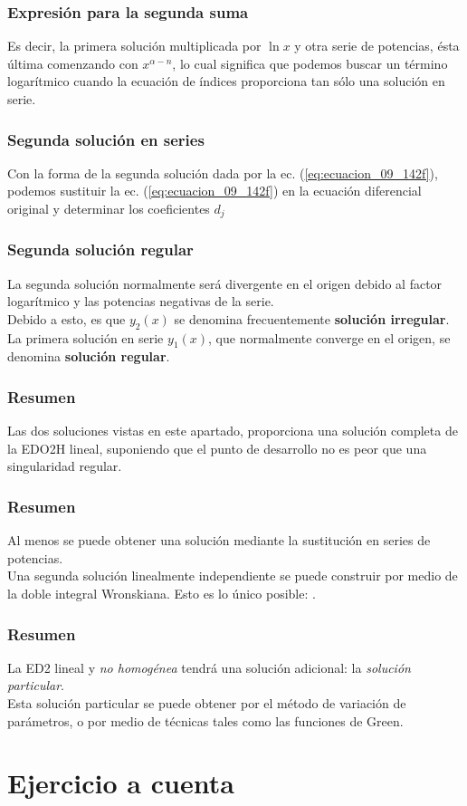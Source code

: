 \documentclass[12pt]{beamer}
\begin{document}
\begin{frame}
\frametitle{Expresión para la segunda suma}
Es decir, la primera solución multiplicada por $\ln x$ y otra serie de potencias, ésta última comenzando con $x^{\alpha - n}$, lo cual significa que podemos buscar un término logarítmico cuando la ecuación de índices proporciona tan sólo una solución en serie.
\end{frame}
\begin{frame}
\frametitle{Segunda solución en series}
Con la forma de la segunda solución dada por la ec. (\ref{eq:ecuacion_09_142f}), podemos sustituir la ec. (\ref{eq:ecuacion_09_142f}) en la ecuación diferencial original y determinar los coeficientes $d_{j}$
\end{frame}
\begin{frame}
\frametitle{Segunda solución regular}
La segunda solución normalmente será divergente en el origen debido al factor logarítmico y las potencias negativas de la serie. 
\\
\bigskip
\pause
Debido a esto, es que $y_{2} (x)$ se denomina frecuentemente \textbf{solución irregular}. La primera solución en serie $y_{1} (x)$, que normalmente converge en el origen, se denomina \textbf{solución regular}.
\end{frame}
\begin{frame}
\frametitle{Resumen}
Las dos soluciones vistas en este apartado, proporciona una solución completa de la EDO2H lineal, suponiendo que el punto de desarrollo no es peor que una singularidad regular. 
\end{frame}
\begin{frame}
\frametitle{Resumen}
Al menos se puede obtener una solución mediante la sustitución en series de potencias.
\\
\bigskip
\pause
Una segunda solución linealmente independiente se puede construir por medio de la doble integral Wronskiana. Esto es lo único posible: .
\end{frame}
\begin{frame}
\frametitle{Resumen}
La ED2 lineal y \textit{no homogénea} tendrá una solución adicional: la \emph{solución particular}.
\\
\bigskip
\pause
Esta solución particular se puede obtener por el método de variación de parámetros, o por medio de técnicas tales como las funciones de Green.
\end{frame}

\section{Ejercicio a cuenta}
\end{document}
